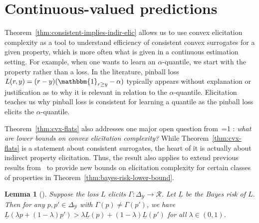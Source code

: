 \documentclass{article}
\newcommand{\Comments}{1}
\newcommand{\mynote}[2]{\ifnum\Comments=1\textcolor{#1}{#2}\fi}
\newcommand{\mytodo}[2]{\ifnum\Comments=1%
	\todo[linecolor=#1!80!black,backgroundcolor=#1,bordercolor=#1!80!black]{#2}\fi}
\newcommand{\raf}[1]{\mynote{green}{[RF: #1]}}
\newcommand{\jessiet}[1]{\mytodo{purple!20!white}{JF: #1}}
\newcommand{\reals}{\mathbb{R}}
\newcommand{\simplex}{\Delta_\Y}
\newcommand{\affhull}{\mathrm{affhull}}
\newcommand{\R}{\mathcal{R}}
\newcommand{\Y}{\mathcal{Y}}
\newcommand{\ones}{\mathbbm{1}}
\newtheorem{lemma}{Lemma}
\begin{document}
\section{Continuous-valued predictions}\label{sec:contin-consis}


Theorem~\ref{thm:consistent-implies-indir-elic} allows us to use convex elicitation complexity as a tool to understand efficiency of consistent convex surrogates for a given property, which is more often what is given in a continuous estimation setting.
For example, when one wants to learn an $\alpha$-quantile, we start with the property rather than a loss.
In the literature, pinball loss $L(r,y) = (r-y)(\ones_{r \geq y} - \alpha)$ typically appears without explanation or justification as to why it is relevant in relation to the $\alpha$-quantile.
Elicitation teaches us why pinball loss is consistent for learning a quantile as the pinball loss elicits the $\alpha$-quantile.


Theorem~\ref{thm:cvx-flats} also addresses one major open question from~\cite{frongillo2015elicitation,frongillo2018elicitation}\jessiet{which citation?}: \emph{what are lower bounds on convex elicitation complexity?}
While Theorem~\ref{thm:cvx-flats} is a statement about consistent surrogates, the heart of it is actually about indirect property elicitation.
Thus, the result also applies to extend previous results from~\cite{frongillo2015elicitation,frongillo2018elicitation} to provide new bounds on elicitation complexity for certain classes of properties in Theorem~\ref{thm:bayes-risk-lower-bound}.

\newcommand{\lbar}{\underline{L}} %
\newcommand{\iden}{\mathrm{iden}}
\newcommand{\Var}{\mathrm{Var}}

\begin{lemma}[\cite{frongillo2018elicitation}]
  \label{lem:elic-complex-bayes-concave}
  Suppose the loss $L$ elicits $\Gamma:\simplex\to\R$.
  Let $\lbar$ be the Bayes risk of $L$.
  Then for any $p,p'\in\simplex$ with $\Gamma(p)\neq\Gamma(p')$, we have $\lbar(\lambda p + (1-\lambda) p') > \lambda \lbar(p) + (1-\lambda) \lbar(p')$ for all $\lambda\in(0,1)$.
\end{lemma}

\end{document}

